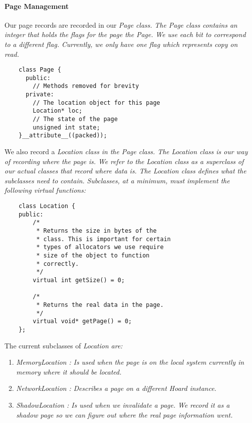 \documentclass[9pt]{sig-alternate-10pt}
\begin{document}
\paragraph{Page Management}
Our page records are recorded in our \em Page \em class. The \em Page \em class contains an integer that holds the flags for the page the \em Page\em. We use each bit to correspond to a different flag. Currently, we only have one flag which represents copy on read. 

\begin{verbatim}
    class Page {
      public:
        // Methods removed for brevity
      private:
        // The location object for this page
        Location* loc;
        // The state of the page
        unsigned int state;
    }__attribute__((packed));
\end{verbatim}

We also record a \em Location \em class in the \em Page \em class. The \em Location \em class is our way of recording where the page is. We refer to the \em Location \em class as a superclass of our actual classes that record where data is. The \em Location \em class defines what the subclasses need to contain. Subclasses, at a minimum, must implement the following \em virtual \em functions:

\begin{verbatim}
    class Location {
    public:
        /*
         * Returns the size in bytes of the  
         * class. This is important for certain 
         * types of allocators we use require  
         * size of the object to function 
         * correctly.
         */
        virtual int getSize() = 0;

        /*
         * Returns the real data in the page.
         */        
        virtual void* getPage() = 0;
    };
\end{verbatim}

The current subclasses of \em Location \em are:

\begin{enumerate}
\item \em MemoryLocation \em: Is used when the page is on the local system currently in memory where it should be located.
\item \em NetworkLocation \em: Describes a page on a different Hoard instance.
\item \em ShadowLocation \em: Is used when we invalidate a page. We record it as a shadow page so we can figure out where the real page information went.
\end{enumerate}
\end{document}
